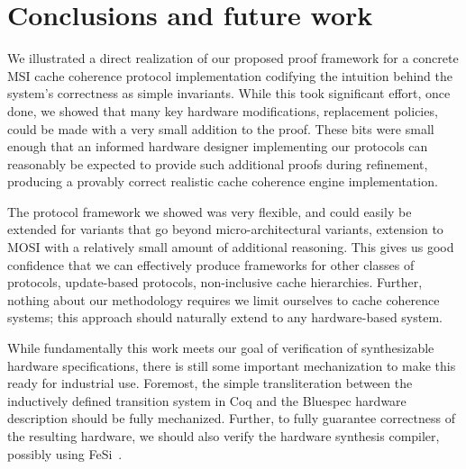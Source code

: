 \section{Conclusions and future work}

We illustrated a direct realization of our proposed proof framework for a
concrete MSI cache coherence protocol implementation codifying the intuition
behind the system's correctness as simple invariants. While this took
significant effort, once done, we showed that many key hardware
modifications,\eg{} replacement policies, could be made with a very small
addition to the proof. These bits were small enough that an informed hardware
designer implementing our protocols can reasonably be expected to provide such
additional proofs during refinement, producing a provably correct realistic
cache coherence engine implementation.

The protocol framework we showed was very flexible, and could easily be
extended for variants that go beyond micro-architectural variants, \eg{}
extension to MOSI with a relatively small amount of additional reasoning. This
gives us good confidence that we can effectively produce frameworks for other
classes of protocols, \eg{} update-based protocols, non-inclusive cache
hierarchies. Further, nothing about our methodology requires we limit ourselves
to cache coherence systems; this approach should naturally extend to any
hardware-based system.

While fundamentally this work meets our goal of verification of synthesizable
hardware specifications, there is still some important mechanization to make
this ready for industrial use. Foremost, the simple transliteration between the
inductively defined transition system in Coq and the Bluespec hardware
description should be fully mechanized.
Further, to fully guarantee correctness of the resulting hardware, we should
also verify the hardware synthesis compiler, possibly using FeSi~\cite{Tomas}.


